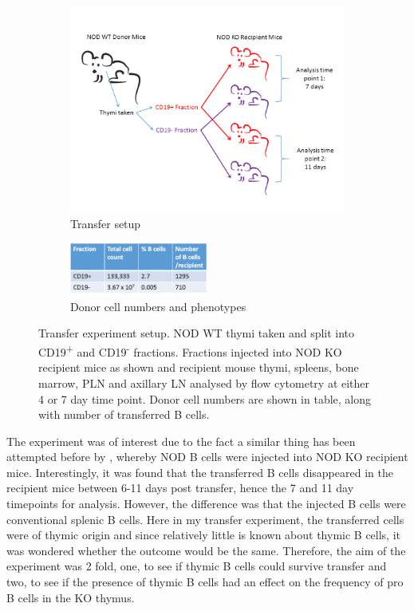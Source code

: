 \begin{figure}
	\begin{subfigure}{\textwidth}
	\includegraphics[width=\textwidth]{Figures/KOTransferexptsetup.png}
	\caption{Transfer setup}
	\label{fig:KOtransfersetup}
	\end{subfigure}
	\begin{subfigure}{\textwidth}
	\centering
	\includegraphics[width=0.5\textwidth]{Figures/WTdonortable2.png}
	\caption{Donor cell numbers and phenotypes}
	\label{subfig:WTdonortable}
	\end{subfigure}
\caption{Transfer experiment setup.
NOD WT thymi taken and split into CD19\textsuperscript{+} and CD19\textsuperscript{-} fractions. 
Fractions injected into NOD KO recipient mice as shown and recipient mouse thymi, spleens, bone marrow, PLN and axillary LN analysed by flow cytometry at either 4 or 7 day time point.
Donor cell numbers are shown in table, along with number of transferred B cells.
}
\end{figure}


The experiment was of interest due to the fact a similar thing has been attempted before by \citet{Serreze1998}, whereby NOD B cells were injected into NOD KO recipient mice.
Interestingly, it was found that the transferred B cells disappeared in the recipient mice between 6-11 days post transfer, hence the 7 and 11 day timepoints for analysis.
However, the difference was that the injected B cells were conventional splenic B cells.
Here in my transfer experiment, the transferred cells were of thymic origin and since relatively little is known about thymic B cells, it was wondered whether the outcome would be the same. 
Therefore, the aim of the experiment was 2 fold, one, to see if thymic B cells could survive transfer and two, to see if the presence of thymic B cells had an effect on the frequency of pro B cells in the KO thymus.

